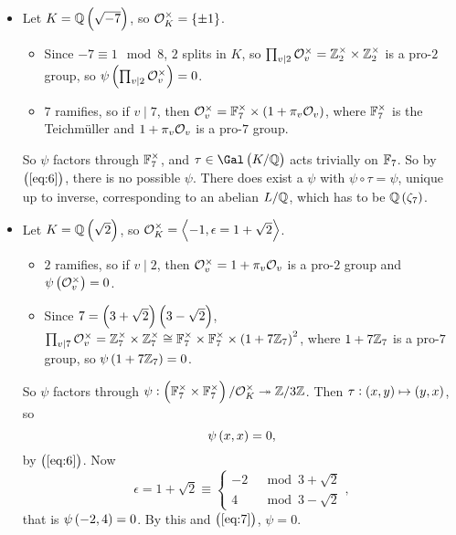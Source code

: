 \begin{itemize}
\item Let $ K = \QQ\br{\sqrt{-7}} $, so $ \OOO_K^\times = \cbr{\pm 1} $.
\begin{itemize}
\item Since $ -7 \equiv 1 \mod 8 $, $ 2 $ splits in $ K $, so $ \prod_{v \mid 2} \mathcal{O}_v^\times = \mathbb{Z}_2^\times \times \mathbb{Z}_2^\times $ is a pro-$ 2 $ group, so $ \psi\br{\prod_{v \mid 2} \OOO_v^\times} = 0 $.
\item $ 7 $ ramifies, so if $ v \mid 7 $, then $ \OOO_v^\times = \FF_7^\times \times \br{1 + \pi_v\OOO_v} $, where $ \mathbb{F}_7^\times $ is the Teichm\"uller and $ 1 + \pi_v\mathcal{O}_v $ is a pro-$ 7 $ group.
\end{itemize}
So $ \psi $ factors through $ \mathbb{F}_7^\times $, and $ \tau \in \Gal\br{K / \QQ} $ acts trivially on $ \mathbb{F}_7 $. So by $ \br{\ref{eq:6}} $, there is no possible $ \psi $. There does exist a $ \psi $ with $ \psi \circ \tau = \psi $, unique up to inverse, corresponding to an abelian $ L / \mathbb{Q} $, which has to be $ \QQ\br{\zeta_7} $.
\item Let $ K = \QQ\br{\sqrt{2}} $, so $ \mathcal{O}_K^\times = \left\langle -1, \epsilon = 1 + \sqrt{2} \right\rangle $.
\begin{itemize}
\item $ 2 $ ramifies, so if $ v \mid 2 $, then $ \mathcal{O}_v^\times = 1 + \pi_v\mathcal{O}_v $ is a pro-$ 2 $ group and $ \psi\br{\OOO_v^\times} = 0 $.
\item Since $ 7 = \br{3 + \sqrt{2}}\br{3 - \sqrt{2}} $, $ \prod_{v \mid 7} \OOO_v^\times = \ZZ_7^\times \times \ZZ_7^\times \cong \FF_7^\times \times \FF_7^\times \times \br{1 + 7\ZZ_7}^2 $, where $ 1 + 7\mathbb{Z}_7 $ is a pro-$ 7 $ group, so $ \psi\br{1 + 7\ZZ_7} = 0 $.
\end{itemize}
So $ \psi $ factors through $ \psi : \br{\FF_7^\times \times \FF_7^\times} / \OOO_K^\times \twoheadrightarrow \ZZ / 3\ZZ $. Then $ \tau : \br{x, y} \mapsto \br{y, x} $, so
\begin{equation}
\label{eq:7}
\psi\br{x, x} = 0,
\end{equation}
by $ \br{\ref{eq:6}} $. Now
$$ \epsilon = 1 + \sqrt{2} \equiv
\begin{cases}
-2 & \mod 3 + \sqrt{2} \\
4 & \mod 3 - \sqrt{2}
\end{cases},
$$
that is $ \psi\br{-2, 4} = 0 $. By this and $ \br{\ref{eq:7}} $, $ \psi = 0 $.
\end{itemize}

\pagebreak

